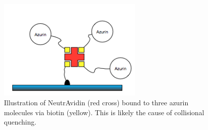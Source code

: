 \documentclass[twoside,single]{lion-msc}
\begin{document}
\begin{figure}[ht!]
\centering
\includegraphics[width=70mm]{ratio_avadin}
\caption{Illustration of NeutrAvidin (red cross) bound to three azurin molecules via biotin (yellow). This is likely the cause of collisional quenching.}
\label{avidinratio}
\end{figure}
\end{document}

